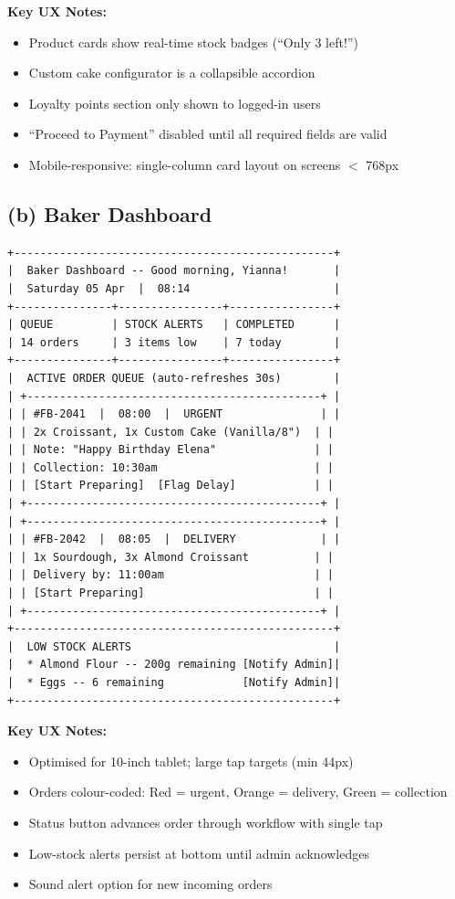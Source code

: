 \documentclass[12pt, a4paper]{report}
\begin{document}
\textbf{Key UX Notes:}
\begin{itemize}[noitemsep]
  \item Product cards show real-time stock badges (``Only 3 left!'')
  \item Custom cake configurator is a collapsible accordion
  \item Loyalty points section only shown to logged-in users
  \item ``Proceed to Payment'' disabled until all required fields are valid
  \item Mobile-responsive: single-column card layout on screens $<$ 768px
\end{itemize}

\subsection{(b) Baker Dashboard}

\begin{lstlisting}[style=wireframe]
+-------------------------------------------------+
|  Baker Dashboard -- Good morning, Yianna!       |
|  Saturday 05 Apr  |  08:14                      |
+---------------+----------------+----------------+
| QUEUE         | STOCK ALERTS   | COMPLETED      |
| 14 orders     | 3 items low    | 7 today        |
+---------------+----------------+----------------+
|  ACTIVE ORDER QUEUE (auto-refreshes 30s)        |
| +---------------------------------------------+ |
| | #FB-2041  |  08:00  |  URGENT               | |
| | 2x Croissant, 1x Custom Cake (Vanilla/8")  | |
| | Note: "Happy Birthday Elena"               | |
| | Collection: 10:30am                        | |
| | [Start Preparing]  [Flag Delay]            | |
| +---------------------------------------------+ |
| +---------------------------------------------+ |
| | #FB-2042  |  08:05  |  DELIVERY             | |
| | 1x Sourdough, 3x Almond Croissant          | |
| | Delivery by: 11:00am                       | |
| | [Start Preparing]                          | |
| +---------------------------------------------+ |
+-------------------------------------------------+
|  LOW STOCK ALERTS                               |
|  * Almond Flour -- 200g remaining [Notify Admin]|
|  * Eggs -- 6 remaining            [Notify Admin]|
+-------------------------------------------------+
\end{lstlisting}

\textbf{Key UX Notes:}
\begin{itemize}[noitemsep]
  \item Optimised for 10-inch tablet; large tap targets (min 44px)
  \item Orders colour-coded: Red = urgent, Orange = delivery, Green = collection
  \item Status button advances order through workflow with single tap
  \item Low-stock alerts persist at bottom until admin acknowledges
  \item Sound alert option for new incoming orders
\end{itemize}
\end{document}
